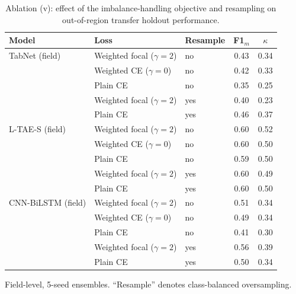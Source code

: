 \documentclass[preprint,authoryear,3p]{elsarticle}
\begin{document}
\begin{table}[!t]
\centering
\scriptsize
\caption{Ablation (v): effect of the imbalance-handling objective and resampling on out-of-region transfer
holdout performance.}
\label{stab:loss}
\renewcommand{\arraystretch}{1.12}
\setlength{\tabcolsep}{8pt}
\begin{tabular}{lllcc}
\toprule
\textbf{Model} & \textbf{Loss} & \textbf{Resample} & \textbf{F1$_m$} & \textbf{$\kappa$} \\
\midrule
TabNet (field)     & Weighted focal ($\gamma{=}2$) & no  & 0.43 & 0.34 \\
                   & Weighted CE ($\gamma{=}0$)    & no  & 0.42 & 0.33 \\
                   & Plain CE                       & no  & 0.35 & 0.25 \\
                   & Weighted focal ($\gamma{=}2$) & yes & 0.40 & 0.23 \\
                   & Plain CE                       & yes & 0.46 & 0.37 \\
\midrule
L-TAE-S (field)    & Weighted focal ($\gamma{=}2$) & no  & 0.60 & 0.52 \\
                   & Weighted CE ($\gamma{=}0$)    & no  & 0.60 & 0.50 \\
                   & Plain CE                       & no  & 0.59 & 0.50 \\
                   & Weighted focal ($\gamma{=}2$) & yes & 0.60 & 0.49 \\
                   & Plain CE                       & yes & 0.60 & 0.50 \\
\midrule
CNN-BiLSTM (field) & Weighted focal ($\gamma{=}2$) & no  & 0.51 & 0.34 \\
                   & Weighted CE ($\gamma{=}0$)    & no  & 0.49 & 0.34 \\
                   & Plain CE                       & no  & 0.41 & 0.30 \\
                   & Weighted focal ($\gamma{=}2$) & yes & 0.56 & 0.39 \\
                   & Plain CE                       & yes & 0.50 & 0.34 \\
\bottomrule
\end{tabular}
\par\vspace{3pt}
\begin{minipage}{\linewidth}
\footnotesize
Field-level, 5-seed ensembles. ``Resample'' denotes class-balanced oversampling.
\end{minipage}
\end{table}
\end{document}
